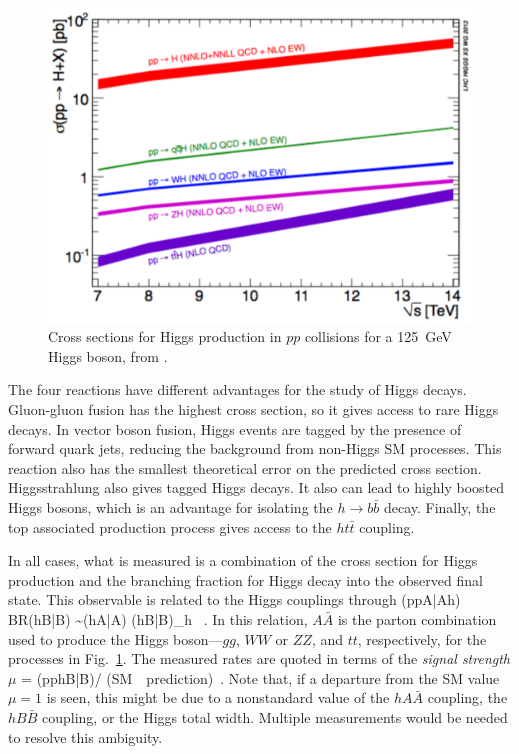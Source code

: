 \documentclass[12pt]{article}
\begin{document}
\begin{figure}
\begin{center}
\includegraphics[width=0.70\hsize]{Higgscs.pdf}
\end{center}
\caption{Cross sections for Higgs production in $pp$ collisions 
for a 125~GeV Higgs
  boson, from \cite{PDGHiggsfourteen}.}
\label{fig:Higgscs}
\end{figure}


The four reactions have different advantages for the study of Higgs
decays.
Gluon-gluon fusion has the highest cross section, so it gives access
to rare Higgs decays.  In vector boson fusion, Higgs events are tagged
by the presence of forward quark jets, reducing the background from
non-Higgs SM processes.  This reaction also has the smallest
theoretical error on the predicted 
cross section.   Higgsstrahlung also gives tagged Higgs decays.  It
also can lead to highly boosted Higgs bosons, which is an advantage
for isolating the $h\to b\bar b$ decay.   Finally, the top  associated
production process gives access to the $ht\bar t$ coupling.

In all cases, what is measured is a combination of the cross section
for Higgs production and the branching fraction for Higgs decay into
the observed final state.    This observable is related to the Higgs
couplings through
\beq
     \sigma(pp\to A\bar A\to h) BR(h\to B\bar B) \sim  {\Gamma(h\to A\bar A)
       \Gamma (h\to B\bar B)\over \Gamma_h }  \ .
In this relation, $A\bar A$ is the parton combination used to produce
the Higgs boson---$gg$, $WW$ or $ZZ$, and $tt$, respectively,
 for the processes in 
Fig.~\ref{fig:Higgscs}.  The measured rates are quoted in terms of the 
{\it signal strength} $\mu$
\beq
    \mu =   \sigma(pp\to h\to B\bar B)/ (\mbox{SM \ prediction})\ .
\eeqn
Note that, if a departure from the SM value $\mu = 1$ is seen, this
might be due to a nonstandard value of the $hA\bar A$ coupling, the
$hB\bar B$ coupling, or the Higgs total width.  Multiple measurements
would be  needed to resolve this ambiguity.
\end{document}
